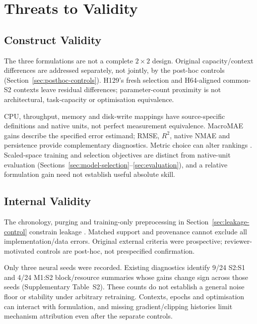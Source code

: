 \documentclass[a4paper,fleqn]{cas-dc}
\begin{document}
\section{Threats to Validity}
\label{sec:threats}

\subsection{Construct Validity}
\label{sec:threats-construct}

The three formulations are not a complete $2\times2$ design. Original
capacity/context differences are addressed separately, not jointly, by the
post-hoc controls (Section~\ref{sec:posthoc-controls}). H129's fresh selection
and H64-aligned common-S2 contexts leave residual differences; parameter-count
proximity is not architectural, task-capacity or optimisation equivalence.

CPU, throughput, memory and disk-write mappings have source-specific
definitions and native units, not perfect measurement equivalence.
MacroMAE gains describe the specified error estimand; RMSE, $R^2$, native
NMAE and persistence provide complementary diagnostics. Metric choice can
alter rankings \citep{Hyndman2006Accuracy}. Scaled-space training and selection
objectives are distinct from native-unit evaluation
(Sections~\ref{sec:model-selection}--\ref{sec:evaluation}), and a relative
formulation gain need not establish useful absolute skill.

\subsection{Internal Validity}
\label{sec:threats-internal}

The chronology, purging and training-only preprocessing in
Section~\ref{sec:leakage-control} constrain leakage
\citep{Cerqueira2020Evaluation,Hyndman2021Forecasting}.
Matched support and provenance cannot exclude all implementation/data errors.
Original external criteria were prospective; reviewer-motivated controls are
post-hoc, not prespecified confirmation.

Only three neural seeds were recorded. Existing diagnostics identify 9/24
S2:S1 and 4/24 M1:S2 block/resource summaries whose gains change sign across
those seeds (Supplementary Table~S2). These counts do not establish a general noise floor or stability
under arbitrary retraining. Contexts, epochs and optimisation can interact
with formulation, and missing gradient/clipping histories limit mechanism
attribution even after the separate controls.
\end{document}
